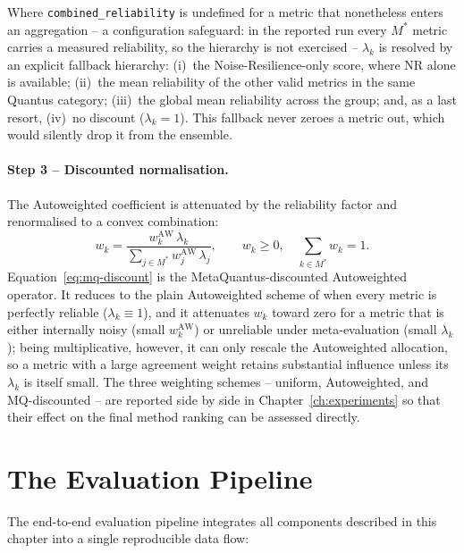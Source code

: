 Where \texttt{combined\_reliability} is undefined for a metric that
nonetheless enters an aggregation -- a configuration safeguard: in the
reported run every $M^{*}$ metric carries a measured reliability, so the
hierarchy is not exercised -- $\lambda_k$ is resolved by an
explicit fallback hierarchy: (i)~the Noise-Resilience-only score, where NR
alone is available;
(ii)~the mean reliability of the other valid metrics in the same
Quantus category; (iii)~the global mean reliability across the group; and, as
a last resort, (iv)~no discount ($\lambda_k = 1$). This fallback never zeroes a
metric out, which would silently drop it from the ensemble.

\paragraph{Step 3 -- Discounted normalisation.}
The Autoweighted coefficient is attenuated by the reliability factor and
renormalised to a convex combination:
\begin{equation}
    w_k = \frac{w_k^{\mathrm{AW}} \, \lambda_k}
               {\sum_{j \in M^{*}} w_j^{\mathrm{AW}} \, \lambda_j},
    \qquad w_k \geq 0, \quad \sum_{k \in M^{*}} w_k = 1.
    \label{eq:mq-discount}
\end{equation}
Equation~\eqref{eq:mq-discount} is the MetaQuantus-discounted Autoweighted
operator. It reduces to the plain Autoweighted scheme of
\citet{hryniewska2024normensemblexai} when every metric is perfectly reliable
($\lambda_k \equiv 1$), and it attenuates $w_k$ toward zero for a metric
that is either
internally noisy (small $w_k^{\mathrm{AW}}$) or unreliable under
meta-evaluation (small
$\lambda_k$); being multiplicative, however, it can only rescale the
Autoweighted allocation, so a metric with a large agreement weight retains
substantial influence unless its $\lambda_k$ is itself small.
The three weighting schemes -- uniform, Autoweighted, and
MQ-discounted -- are reported side by side in Chapter~\ref{ch:experiments} so
that their effect on the final method ranking can be assessed directly.

\section{The Evaluation Pipeline}
\label{sec:pipeline}

The end-to-end evaluation pipeline integrates all components described in
this chapter into a single reproducible data flow:

